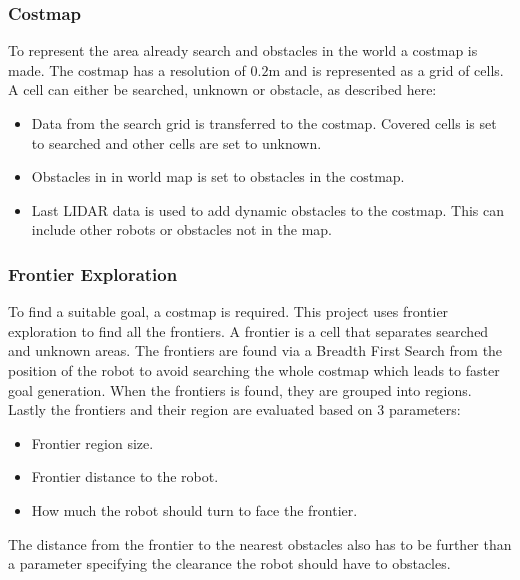 \subsubsection{Costmap}\label{sec:costmap}
To represent the area already search and obstacles in the world a costmap is made. 
The costmap has a resolution of $0.2$m and is represented as a grid of cells. A cell can either be searched, unknown or obstacle, as described here:
\begin{itemize}
  \item Data from the search grid is transferred to the costmap. Covered cells is set to searched and other cells are set to unknown.
  \item Obstacles in in world map is set to obstacles in the costmap.
  \item Last LIDAR data is used to add dynamic obstacles to the costmap. This can include other robots or obstacles not in the map.
\end{itemize}

\subsubsection{Frontier Exploration}\label{sec:frontier_exploration}
To find a suitable goal, a costmap is required.
This project uses frontier exploration to find all the frontiers. 
A frontier is a cell that separates searched and unknown areas. 
The frontiers are found via a Breadth First Search from the position of the robot  to avoid searching the whole costmap which leads to faster goal generation. When the frontiers is found, they are grouped into regions. 
Lastly the frontiers and their region are evaluated based on 3 parameters:
\begin{itemize}
  \item Frontier region size.
  \item Frontier distance to the robot.
  \item How much the robot should turn to face the frontier.
\end{itemize}
The distance from the frontier to the nearest obstacles also has to be further than a parameter specifying the clearance the robot should have to obstacles.


